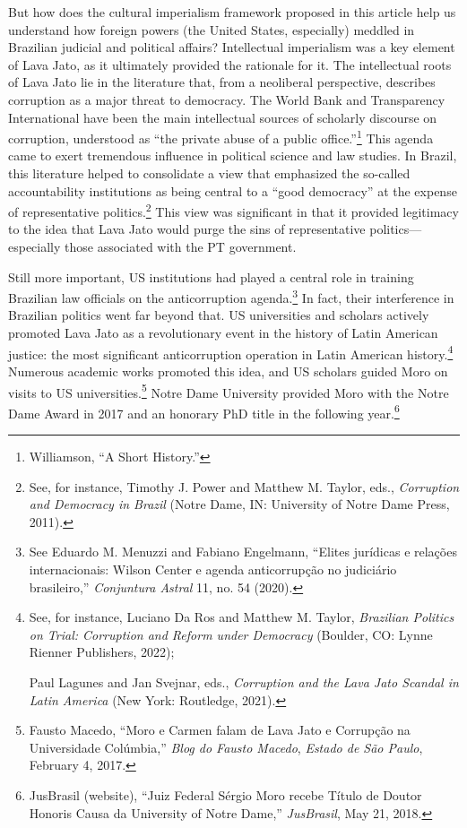 \documentclass{tufte-handout}
\begin{document}
But how does the cultural imperialism framework proposed in this article
help us understand how foreign powers (the United States, especially)
meddled in Brazilian judicial and political affairs? Intellectual
imperialism was a key element of Lava Jato, as it ultimately provided
the rationale for it. The intellectual roots of Lava Jato lie in the
literature that, from a neoliberal perspective, describes corruption as
a major threat to democracy. The World Bank and Transparency
International have been the main intellectual sources of scholarly
discourse on corruption, understood as ``the private abuse of a public
office.''\footnote{Williamson, ``A Short
  History.''} This agenda came to
exert tremendous influence in political science and law studies. In
Brazil, this literature helped to consolidate a view that emphasized the
so-called accountability institutions as being central to a ``good
democracy'' at the expense of representative politics.\footnote{See, for
  instance, Timothy J. Power and Matthew M. Taylor, eds.,
  \emph{Corruption and Democracy in Brazil} (Notre Dame, IN: University
  of Notre Dame Press, 2011).} This view was significant in that it
provided legitimacy to the idea that Lava Jato would purge the sins of
representative politics---especially those associated with the PT
government.

Still more important, US institutions had played a central role in
training Brazilian law officials on the anticorruption
agenda.\footnote{See Eduardo M. Menuzzi and Fabiano Engelmann, ``Elites
  jurídicas e relações internacionais: Wilson Center e agenda
  anticorrupção no judiciário brasileiro,'' \emph{Conjuntura Astral} 11,
  no. 54 (2020).} In fact, their interference in Brazilian politics went
far beyond that. US universities and scholars actively promoted Lava
Jato as a revolutionary event in the history of Latin American justice:
the most significant anticorruption operation in Latin American
history.\footnote{See, for instance, Luciano Da Ros and Matthew M.
  Taylor, \emph{Brazilian Politics on Trial: Corruption and Reform under
  Democracy} (Boulder, CO: Lynne Rienner Publishers, 2022);

  Paul Lagunes and Jan Svejnar, eds., \emph{Corruption and the Lava Jato
  Scandal in Latin America} (New York: Routledge, 2021).} Numerous
academic works promoted this idea, and US scholars guided Moro on visits
to US universities.\footnote{Fausto Macedo, ``Moro e Carmen falam de
  Lava Jato e Corrupção na Universidade Colúmbia,'' \emph{Blog do Fausto
  Macedo}, \emph{Estado de São Paulo}, February 4, 2017.} Notre Dame
University provided Moro with the Notre Dame Award in 2017 and an
honorary PhD title in the following year.\footnote{JusBrasil (website),
  ``Juiz Federal Sérgio Moro recebe Título de Doutor Honoris Causa da
  University of Notre Dame,'' \emph{JusBrasil}, May 21, 2018.}
\end{document}
